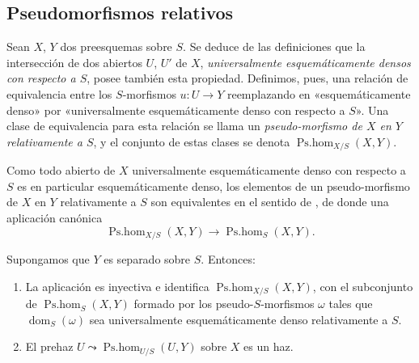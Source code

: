 \subsection{Pseudomorfismos relativos}
\label{IV.20.5}

\begin{env}[20.5.1]
\label{IV.20.5.1}
Sean $X$, $Y$ dos preesquemas sobre $S$.
Se deduce de las definiciones  que la intersección de dos abiertos $U$, $U'$ de $X$, \emph{universalmente esquemáticamente densos con respecto a $S$}, posee también esta propiedad.
Definimos, pues, una relación de equivalencia entre los $S$-morfismos $u:U\to Y$ reemplazando en  «esquemáticamente denso» por «universalmente esquemáticamente denso con respecto a $S$».
Una clase de equivalencia para esta relación se llama un \emph{pseudo-morfismo de $X$ en $Y$ relativamente a $S$}, y el conjunto de estas clases se denota $\operatorname{Ps.hom}_{X/S}(X,Y)$.
\end{env}

\begin{env}[20.5.2]
\label{IV.20.5.2}
Como todo abierto de $X$ universalmente esquemáticamente denso con respecto a $S$ es en particular esquemáticamente denso, los elementos de un pseudo-morfismo
de $X$ en $Y$ relativamente a $S$ son equivalentes en el sentido de , de donde una aplicación canónica
\[
\label{IV.20.5.2.1}
  \operatorname{Ps.hom}_{X/S}(X,Y)\to\operatorname{Ps.hom}_S(X,Y).
  \tag{20.5.2.1}
\]
\end{env}

\begin{proposition}[20.5.3]
\label{IV.20.5.3}
Supongamos que $Y$ es separado sobre $S$.
Entonces:
\begin{enumerate}[label=\emph{(\roman*)}]
  \item La aplicación  es inyectiva e identifica $\operatorname{Ps.hom}_{X/S}(X,Y)$, con el subconjunto de $\operatorname{Ps.hom}_S(X,Y)$ formado por los pseudo-$S$-morfismos $\omega$ tales que $\operatorname{dom}_S(\omega)$ sea universalmente esquemáticamente denso relativamente a $S$.
  \item El prehaz $U\leadsto\operatorname{Ps.hom}_{U/S}(U,Y)$ sobre $X$ es un haz.
\end{enumerate}
\end{proposition}

